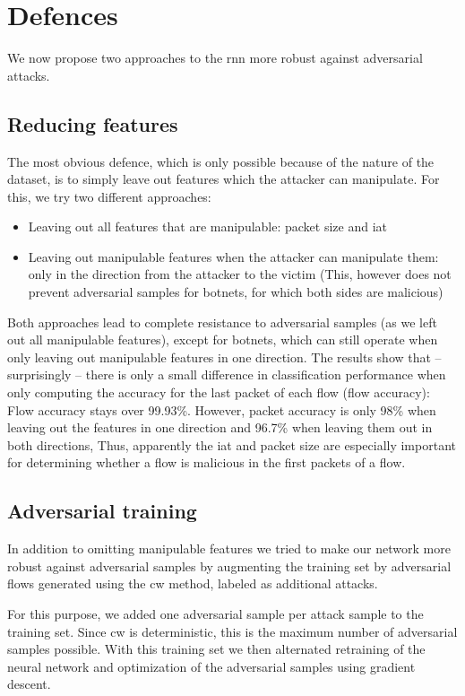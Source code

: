 \documentclass[conference]{IEEEtran}
\begin{document}
\section{Defences}
We now propose two approaches to the \gls{rnn} more robust against adversarial attacks.
\subsection{Reducing features}
The most obvious defence, which is only possible because of the nature of the dataset, is to simply leave out features which the attacker can manipulate. For this, we try two different approaches:
\begin{itemize}[topsep=0pt,wide,labelwidth=!,labelindent=0pt]
\item Leaving out all features that are manipulable: packet size and \gls{iat}
\item Leaving out manipulable features when the attacker can manipulate them: only in the direction from the attacker to the victim (This, however does not prevent adversarial samples for botnets, for which both sides are malicious)
\end{itemize}

Both approaches lead to complete resistance to adversarial samples (as we left out all manipulable features), except for botnets, which can still operate when only leaving out manipulable features in one direction. The results show that -- surprisingly -- there is only a small difference in classification performance when only computing the accuracy for the last packet of each flow (flow accuracy): Flow accuracy stays over 99.93\%. However, packet accuracy is only 98\% when leaving out the features in one direction and 96.7\% when leaving them out in both directions, Thus, apparently the \gls{iat} and packet size are especially important for determining whether a flow is malicious in the first packets of a flow.

\subsection{Adversarial training}
In addition to omitting manipulable features we tried to make our network more robust against adversarial samples by augmenting the training set by adversarial flows generated using the \gls{cw} method, labeled as additional attacks.

For this purpose, we added one adversarial sample per attack sample to the training set. Since \gls{cw} is deterministic, this is the maximum number of adversarial samples possible. With this training set we then alternated retraining of the neural network and optimization of the adversarial samples using gradient descent.
\end{document}
